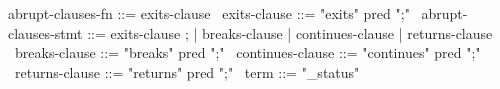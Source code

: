 \begin{syntax}
  abrupt-clauses-fn ::= exits-clause
  \
  exits-clause ::= "exits" pred ";"
  \
  abrupt-clauses-stmt ::= exits-clause ;
        | breaks-clause | continues-clause | returns-clause
  \
  breaks-clause ::= "breaks" pred ";"
  \
  continues-clause ::= "continues" pred ";"
  \
  returns-clause ::= "returns" pred ";"
  \
  term  ::= "\exit_status"
\end{syntax}